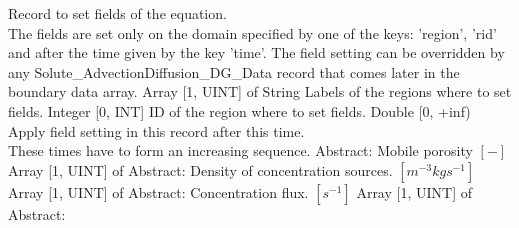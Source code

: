 \begin{RecordType}
	{}
	{} %
	{} %
	{} %
	{{{Record to set fields of the equation.}\\{
The fields are set only on the domain specified by one of the keys: 'region', 'rid'}\\{
and after the time given by the key 'time'. The field setting can be overridden by}\\{
 any Solute{\_}AdvectionDiffusion{\_}DG{\_}Data record that comes later in the boundary data array.}}}
		\KeyItem
			{}
			{{Array [1, UINT] of }{String}}
			{\textrangle}
			{} %
			{{{Labels of the regions where to set fields. }}}
		\KeyItem
			{}
			{{Integer [0, INT]}}
			{\textrangle}
			{} %
			{{{ID of the region where to set fields.}}}
		\KeyItem
			{}
			{{Double [0, +inf)}}
			{\textrangle}
			{} %
			{{{Apply field setting in this record after this time.}\\{
These times have to form an increasing sequence.}}}
		\KeyItem
			{}
			{{Abstract}{: }}
			{\textrangle}
			{} %
			{{{Mobile porosity }{$[-]$}}}
		\KeyItem
			{}
			{{Array [1, UINT] of }{Abstract}{: }}
			{\textrangle}
			{} %
			{{{Density of concentration sources. }{$[m^{-3}kgs^{-1}]$}}}
		\KeyItem
			{}
			{{Array [1, UINT] of }{Abstract}{: }}
			{\textrangle}
			{} %
			{{{Concentration flux. }{$[s^{-1}]$}}}
		\KeyItem
			{}
			{{Array [1, UINT] of }{Abstract}{: }}

\end{RecordType}
